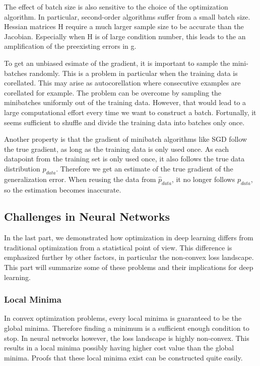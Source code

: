 The effect of batch size is also sensitive to the choice of the optimization
algorithm. In particular, second-order algorithms suffer from a small batch
size. Hessian matrices H require a much larger sample size to be accurate than
the Jacobian. Especially when H is of large condition number, this leads to the
an amplification of the preexisting errors in g.

To get an unbiased esimate of the gradient, it is important to sample the
mini-batches randomly. This is a problem in particular when the training data is
corellated. This may arise as autocorellation where consecutive examples are
corellated for example. The problem can be overcome by sampling the minibatches
uniformly out of the training data. However, that would lead to a large
computational effort every time we want to construct a batch. Fortunally, it
seems sufficient to shuffle and divide the training data into batches only once.

Another property is that the gradient of minibatch algorithms like SGD follow
the true gradient, as long as the training data is only used once. As each
datapoint from the training set is only used once, it also follows the true data
distribution $p_{data}$. Therefore we get an estimate of the true gradient of
the generalization error. When reusing the data from $\hat{p}_{data}$, it no
longer follows $p_{data}$, so the estimation becomes inaccurate.

\subsection{Challenges in Neural Networks}
In the last part, we demonstrated how optimization in deep learning differs from
traditional optimization from a statistical point of view. This difference is
emphasized further by other factors, in particular the non-convex loss
landscape. This part will summarize some of these problems and their
implications for deep learning.


\subsubsection{Local Minima}\label{sub:Local_minima}
In convex optimization problems, every local minima is guaranteed to be the
global minima. Therefore finding a minimum is a sufficient enough condition to
stop. In neural networks however, the loss landscape is highly non-convex. This
results in a local minima possibly having higher cost value than the global
minima. Proofs that these local minima exist can be constructed quite easily.

